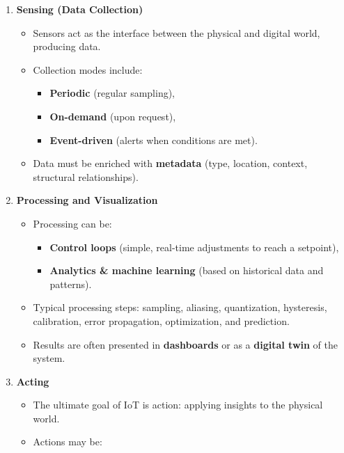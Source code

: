 \documentclass[a4paper, 12pt]{book} %
\begin{document}
\begin{enumerate}
\def\labelenumi{\arabic{enumi}.}
\item
  \textbf{Sensing (Data Collection)}

  \begin{itemize}
  \item
    Sensors act as the interface between the physical and digital world,
    producing data.
  \item
    Collection modes include:

    \begin{itemize}
    \item
      \textbf{Periodic} (regular sampling),
    \item
      \textbf{On-demand} (upon request),
    \item
      \textbf{Event-driven} (alerts when conditions are met).
    \end{itemize}
  \item
    Data must be enriched with \textbf{metadata} (type, location,
    context, structural relationships).
  \end{itemize}
\item
  \textbf{Processing and Visualization}

  \begin{itemize}
  \item
    Processing can be:

    \begin{itemize}
    \item
      \textbf{Control loops} (simple, real-time adjustments to reach a
      setpoint),
    \item
      \textbf{Analytics \& machine learning} (based on historical data
      and patterns).
    \end{itemize}
  \item
    Typical processing steps: sampling, aliasing, quantization,
    hysteresis, calibration, error propagation, optimization, and
    prediction.
  \item
    Results are often presented in \textbf{dashboards} or as a
    \textbf{digital twin} of the system.
  \end{itemize}
\item
  \textbf{Acting}

  \begin{itemize}
  \item
    The ultimate goal of IoT is action: applying insights to the
    physical world.
  \item
    Actions may be:


\end{itemize}
\end{enumerate}
\end{document}
